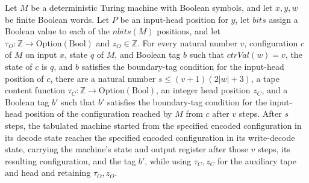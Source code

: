 \begin{theorem}
\label{Complexity.Meyer.loop_run}
\leanok
{}
Let $M$ be a deterministic Turing machine with Boolean symbols, and let $x,y,w$ be
finite Boolean words. Let $P$ be an input-head position for $y$, let $bits$ assign a
Boolean value to each of the $nbits(M)$ positions, and let
$\tau_O:\mathbb{Z}\to\mathrm{Option}(\mathrm{Bool})$ and $z_O\in\mathbb{Z}$. For every
natural number $v$, configuration $c$ of $M$ on input $x$, state $q$ of $M$, and Boolean
tag $b$ such that $ctrVal(w)=v$, the state of $c$ is $q$, and $b$ satisfies the
boundary-tag condition for the input-head position of $c$, there are a natural number
$s\le (v+1)(2|w|+3)$, a tape content function
$\tau_C:\mathbb{Z}\to\mathrm{Option}(\mathrm{Bool})$, an integer head position $z_C$,
and a Boolean tag $b'$ such that $b'$ satisfies the boundary-tag condition for the
input-head position of the configuration reached by $M$ from $c$ after $v$ steps. After
$s$ steps, the tabulated machine started from the specified encoded configuration in its
decode state reaches the specified encoded configuration in its write-decode state,
carrying the machine's state and output register after those $v$ steps, its resulting
configuration, and the tag $b'$, while using $\tau_C,z_C$ for the auxiliary tape and
head and retaining $\tau_O,z_O$.
\end{theorem}
